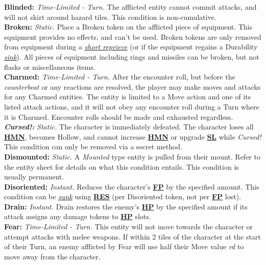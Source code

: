 \documentclass[12pt]{article}
\newcommand{\refto}[1]{\hyperlink{#1}{\textbf{#1}}}
\newcommand{\reftoit}[1]{\hyperlink{#1}{\emph{#1}}}
\begin{document}
\begin{multicols*}{2}
\textbf{Blinded:} \emph{Time-Limited - Turn.} The afflicted entity cannot commit attacks, and will not skirt around hazard tiles. This condition is non-cumulative.\\

\textbf{Broken:} \emph{Static.} Place a Broken token on the afflicted piece of equipment. This equipment provides no effects, and can’t be used. Broken tokens are only removed from equipment during a \reftoit{short reprieve} (or if the equipment regains a Durability \reftoit{sink}). All pieces of equipment including rings and missiles can be broken, but not flasks or miscellaneous items.\\

\textbf{Charmed:} \emph{Time-Limited - Turn.} After the encounter roll, but before the \emph{counterbeat} or any reactions are resolved, the player may make moves and attacks for any Charmed entities. The entity is limited to a Move action and one of its listed attack actions, and it will not obey any encounter roll during a Turn where it is Charmed. Encounter rolls should be made and exhausted regardless.\\

\textbf{\emph{Cursed!:}} \emph{Static.} The character is immediately defeated. The character loses all \refto{HMN}, becomes Hollow, and cannot increase \refto{HMN} or upgrade \refto{SL} while \emph{Cursed!} This condition can only be removed via a secret method.\\

\textbf{Dismounted:} \emph{Static.} A \emph{Mounted} type entity is pulled from their mount. Refer to the entity sheet for details on what this condition entails. This condition is usually permanent.\\

\textbf{Disoriented:} \emph{Instant.} Reduces the character’s \refto{FP} by the specified amount. This condition can be \reftoit{sunk} using \refto{RES} (per Disoriented token, not per \refto{FP} lost).\\

\textbf{Drain:} \emph{Instant.} Drain restores the enemy’s \refto{HP} by the specified amount if its attack assigns any damage tokens to \refto{HP} slots. \\

\textbf{Fear:} \emph{Time-Limited - Turn.} This entity will not move towards the character or attempt attacks with melee weapons. If within 2 tiles of the character at the start of their Turn, an enemy afflicted by Fear will use half their Move value \emph{rd} to move away from the character.\\


\end{multicols*}
\end{document}
